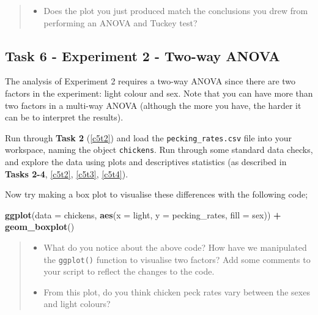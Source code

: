 \documentclass[
]{book}
\newenvironment{Shaded}{\begin{snugshade}}{\end{snugshade}}
\newcommand{\AttributeTok}[1]{\textcolor[rgb]{0.13,0.29,0.53}{#1}}
\newcommand{\FunctionTok}[1]{\textcolor[rgb]{0.13,0.29,0.53}{\textbf{#1}}}
\newcommand{\NormalTok}[1]{#1}
\newcommand{\SpecialCharTok}[1]{\textcolor[rgb]{0.81,0.36,0.00}{\textbf{#1}}}
\providecommand{\tightlist}{%
  \setlength{\itemsep}{0pt}\setlength{\parskip}{0pt}}
\begin{document}
\begin{quote}
\begin{itemize}
\tightlist
\item
  Does the plot you just produced match the conclusions you drew from performing an ANOVA and Tuckey test?
\end{itemize}
\end{quote}

\hypertarget{first-boxplot}{%
\subsection{Task 6 - Experiment 2 - Two-way ANOVA}\label{first-boxplot}}

The analysis of Experiment 2 requires a two-way ANOVA since there are two factors in the experiment: light colour and sex. Note that you can have more than two factors in a multi-way ANOVA (although the more you have, the harder it can be to interpret the results).

Run through \textbf{Task 2} (\ref{c5t2}) and load the \texttt{pecking\_rates.csv} file into your workspace, naming the object \texttt{chickens}. Run through some standard data checks, and explore the data using plots and descriptives statistics (as described in \textbf{Tasks 2-4}, \ref{c5t2}, \ref{c5t3}, \ref{c5t4}).

Now try making a box plot to visualise these differences with the following code;

\begin{Shaded}
\begin{Highlighting}[]
\FunctionTok{ggplot}\NormalTok{(}\AttributeTok{data =}\NormalTok{ chickens, }\FunctionTok{aes}\NormalTok{(}\AttributeTok{x =}\NormalTok{ light, }\AttributeTok{y =}\NormalTok{ pecking\_rates, }\AttributeTok{fill =}\NormalTok{ sex)) }\SpecialCharTok{+}
  \FunctionTok{geom\_boxplot}\NormalTok{()}
\end{Highlighting}
\end{Shaded}

\begin{quote}
\begin{itemize}
\tightlist
\item
  What do you notice about the above code? How have we manipulated the \texttt{ggplot()} function to visualise two factors? Add some comments to your script to reflect the changes to the code.
\item
  From this plot, do you think chicken peck rates vary between the sexes and light colours?
\end{itemize}
\end{quote}
\end{document}
